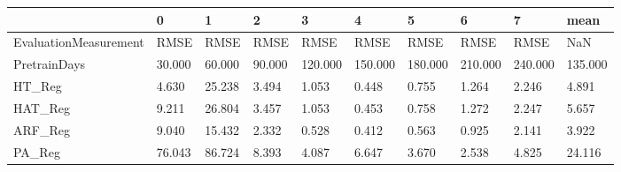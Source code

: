 \begin{tabular}{llllllllll}
\toprule
{} &      0 &      1 &      2 &       3 &       4 &       5 &       6 &       7 &    mean \\
\midrule
EvaluationMeasurement &   RMSE &   RMSE &   RMSE &    RMSE &    RMSE &    RMSE &    RMSE &    RMSE &     NaN \\
PretrainDays          & 30.000 & 60.000 & 90.000 & 120.000 & 150.000 & 180.000 & 210.000 & 240.000 & 135.000 \\
HT\_Reg                &  4.630 & 25.238 &  3.494 &   1.053 &   0.448 &   0.755 &   1.264 &   2.246 &   4.891 \\
HAT\_Reg               &  9.211 & 26.804 &  3.457 &   1.053 &   0.453 &   0.758 &   1.272 &   2.247 &   5.657 \\
ARF\_Reg               &  9.040 & 15.432 &  2.332 &   0.528 &   0.412 &   0.563 &   0.925 &   2.141 &   3.922 \\
PA\_Reg                & 76.043 & 86.724 &  8.393 &   4.087 &   6.647 &   3.670 &   2.538 &   4.825 &  24.116 \\
\bottomrule
\end{tabular}
